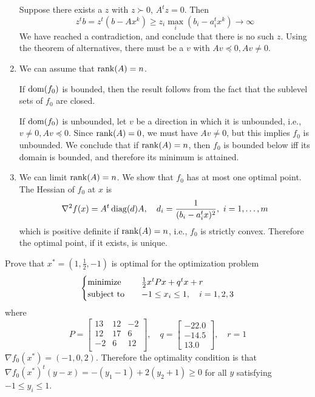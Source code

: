 \begin{problem}[4.2]
\begin{enumerate}
        Suppose there exists a $z$ with $z \succ 0$, $A^tz = 0$. Then \[z^tb = z^t(b - Ax^k) \ge z_i\max_{i}(b_i - a_i^tx^k) \to \infty\]
        We have reached a contradiction, and conclude that there is no such $z$. Using the theorem of alternatives, there must be a $v$ with $Av \preceq 0, Av \neq 0$.
        \item We can assume that $\rank(A) = n$.
        
        If $\operatorname{dom}(f_0)$ is bounded, then the result follows from the fact that the sublevel sets of $f_0$ are closed.

        If $\operatorname{dom}(f_0)$ is unbounded, let $v$ be a direction in which it is unbounded, i.e., $v \neq 0, Av \preceq 0$. Since $\rank(A) = 0$, we must have $Av \neq 0$, but this implies $f_0$ is unbounded. We conclude that if $\rank(A) = n$, then $f_0$ is bounded below iff its domain is bounded, and therefore its minimum is attained.
        \item We can limit $\rank(A) = n$. We show that $f_0$ has at most one optimal point. The Hessian of $f_0$ at $x$ is \[\nabla^2f(x) = A^t\operatorname{diag}(d)A, \quad d_i = \frac{1}{(b_i - a_i^tx)^2}, \ i = 1, \dots, m\] which is positive definite if $\rank(A) = n$, i.e., $f_0$ is strictly convex. Therefore the optimal point, if it exists, is unique. 
    \end{enumerate}
\end{problem}

\begin{problem}[4.3]
    Prove that $x^* = \left(1, \frac{1}{2}, -1\right)$ is optimal for the optimization problem\[\begin{cases}
        \operatorname{minimize} \quad &\frac{1}{2}x^tPx + q^tx + r\\
        \operatorname{subject\ to} \quad & -1 \le x_i \le 1, \quad i = 1, 2, 3
    \end{cases}\] where \[P = \begin{bmatrix}
        13 & 12 & -2\\
        12 & 17 & 6\\
        -2 & 6 & 12\\
    \end{bmatrix}, \quad q = \begin{bmatrix}
        -22.0 \\ -14.5 \\ 13.0
    \end{bmatrix}, \quad r = 1\]
    \Answer $\nabla f_0(x^*) = (-1, 0, 2)$. Therefore the optimality condition is that $\nabla f_0(x^*)^t(y - x) = -(y_1 - 1) + 2(y_2 + 1) \ge 0$ for all $y$ satisfying $-1 \le y_i \le 1$.
\end{problem}

